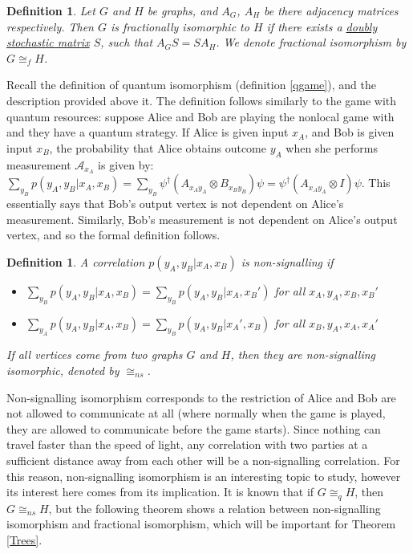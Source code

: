 \documentclass[12pt]{article}
\newtheorem{defn}[thm]{Definition}
\begin{document}
\begin{defn} Let $G$ and $H$ be graphs, and $A_G$, $A_H$ be there adjacency matrices respectively. Then $G$ is fractionally isomorphic to $H$ if there exists a \hyperlink{stochastic}{doubly stochastic matrix} $S$, such that $A_GS = SA_H$. We denote fractional isomorphism by $G \cong_f H$.
\end{defn}

Recall the definition of quantum isomorphism (definition \ref{qgame}), and the description provided above it. The definition follows similarly to the game with quantum resources: suppose Alice and Bob are playing the nonlocal game with and they have a quantum strategy. If Alice is given input $x_A$, and Bob is given input $x_B$, the probability that Alice obtains outcome $y_A$ when she performs measurement $\mathcal{A}_{x_A}$ is given by: $\sum_{y_B}p(y_A, y_B | x_A, x_B) = \sum_{y_B}\psi^\dag(A_{x_Ay_A}\otimes B_{x_By_B})\psi = \psi^\dag(A_{x_Ay_A}\otimes I)\psi$. This essentially says that Bob's output vertex is not dependent on Alice's measurement. Similarly, Bob's measurement is not dependent on Alice's output vertex, and so the formal definition follows.

\begin{defn}
A correlation $p(y_A, y_B | x_A, x_B)$ is non-signalling if 
\begin{itemize}
\item $\sum_{y_B}p(y_A, y_B | x_A, x_B) = \sum_{y_B}p(y_A, y_B | x_A, x_B')$ for all $x_A, y_A, x_B, x_B'$
\item $\sum_{y_A}p(y_A, y_B | x_A, x_B) = \sum_{y_B}p(y_A, y_B | x_A', x_B)$ for all $x_B, y_A, x_A, x_A'$
\end{itemize}
If all vertices come from two graphs $G$ and $H$, then they are non-signalling isomorphic, denoted by $\cong_{ns}$.
\end{defn}

Non-signalling isomorphism corresponds to the restriction of Alice and Bob are not allowed to communicate at all (where normally when the game is played, they are allowed to communicate before the game starts). Since nothing can travel faster than the speed of light, any correlation with two parties at a sufficient distance away from each other will be a non-signalling correlation. For this reason, non-signalling isomorphism is an interesting topic to study, however its interest here comes from its implication. It is known that if $G \cong_q H$, then $G \cong_{ns}H$, but the following theorem shows a relation between non-signalling isomorphism and fractional isomorphism, which will be important for Theorem \ref{Trees}.
\end{document}
